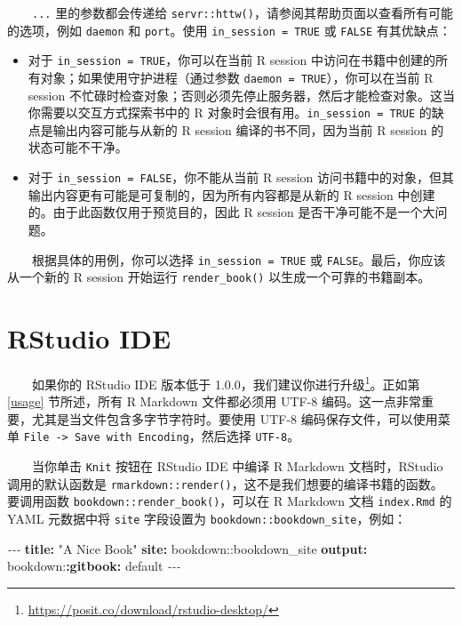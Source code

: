 \documentclass[
  12pt,
]{krantz}
\newenvironment{Shaded}{\begin{snugshade}}{\end{snugshade}}
\newcommand{\AttributeTok}[1]{\textcolor[rgb]{0.13,0.29,0.53}{#1}}
\newcommand{\FunctionTok}[1]{\textcolor[rgb]{0.13,0.29,0.53}{\textbf{#1}}}
\newcommand{\KeywordTok}[1]{\textcolor[rgb]{0.13,0.29,0.53}{\textbf{#1}}}
\newcommand{\PreprocessorTok}[1]{\textcolor[rgb]{0.56,0.35,0.01}{\textit{#1}}}
\newcommand{\StringTok}[1]{\textcolor[rgb]{0.31,0.60,0.02}{#1}}
\providecommand{\tightlist}{%
  \setlength{\itemsep}{0pt}\setlength{\parskip}{0pt}}
\renewcommand{\href}[2]{#2\footnote{\url{#1}}}
\theoremstyle{definition}
\theoremstyle{definition}
\theoremstyle{definition}
\theoremstyle{definition}
\theoremstyle{remark}
\begin{document}
  \texttt{...} 里的参数都会传递给 \texttt{servr::httw()}，请参阅其帮助页面以查看所有可能的选项，例如 \texttt{daemon} 和 \texttt{port}。使用 \texttt{in\_session\ =\ TRUE} 或 \texttt{FALSE} 有其优缺点：

\begin{itemize}
\tightlist
\item
  对于 \texttt{in\_session\ =\ TRUE}，你可以在当前 R session 中访问在书籍中创建的所有对象；如果使用守护进程（通过参数 \texttt{daemon\ =\ TRUE}），你可以在当前 R session 不忙碌时检查对象；否则必须先停止服务器，然后才能检查对象。这当你需要以交互方式探索书中的 R 对象时会很有用。\texttt{in\_session\ =\ TRUE} 的缺点是输出内容可能与从新的 R session 编译的书不同，因为当前 R session 的状态可能不干净。
\item
  对于 \texttt{in\_session\ =\ FALSE}，你不能从当前 R session 访问书籍中的对象，但其输出内容更有可能是可复制的，因为所有内容都是从新的 R session 中创建的。由于此函数仅用于预览目的，因此 R session 是否干净可能不是一个大问题。
\end{itemize}

  根据具体的用例，你可以选择 \texttt{in\_session\ =\ TRUE} 或 \texttt{FALSE}。最后，你应该从一个新的 R session 开始运行 \texttt{render\_book()} 以生成一个可靠的书籍副本。

\hypertarget{rstudio-ide}{%
\section{RStudio IDE}\label{rstudio-ide}}

  如果你的 RStudio IDE 版本低于 1.0.0，我们建议你进行\href{https://posit.co/download/rstudio-desktop/}{升级}。正如第 \ref{usage} 节所述，所有 R Markdown 文件都必须用 UTF-8 编码。这一点非常重要，尤其是当文件包含多字节字符时。要使用 UTF-8 编码保存文件，可以使用菜单 \texttt{File\ -\textgreater{}\ Save\ with\ Encoding}，然后选择 \texttt{UTF-8}。

  当你单击 \texttt{Knit} 按钮在 RStudio IDE 中编译 R Markdown 文档时，RStudio 调用的默认函数是 \texttt{rmarkdown::render()}，这不是我们想要的编译书籍的函数。要调用函数 \texttt{bookdown::render\_book()}，可以在 R Markdown 文档 \texttt{index.Rmd} 的 YAML 元数据中将 \texttt{site} 字段设置为 \texttt{bookdown::bookdown\_site}，例如：

\begin{Shaded}
\begin{Highlighting}[]
\PreprocessorTok{{-}{-}{-}}
\FunctionTok{title}\KeywordTok{:}\AttributeTok{ }\StringTok{"A Nice Book"}
\FunctionTok{site}\KeywordTok{:}\AttributeTok{ bookdown::bookdown\_site}
\FunctionTok{output}\KeywordTok{:}
\AttributeTok{  bookdown:}\FunctionTok{:gitbook}\KeywordTok{:}\AttributeTok{ default}
\PreprocessorTok{{-}{-}{-}}
\end{Highlighting}
\end{Shaded}
\end{document}
